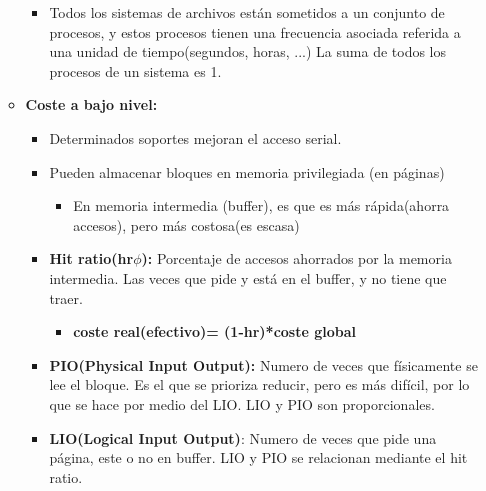 \documentclass[12pt, twoside, openright]{report} %
\begin{document}
\begin{itemize}
\begin{itemize}
        \begin{itemize}
        \item Todos los sistemas de archivos están sometidos a un conjunto
          de procesos, y estos procesos tienen una frecuencia asociada
          referida a una unidad de tiempo(segundos, horas, ...) La suma
          de todos los procesos de un sistema es 1.
          
        \end{itemize}
      \item \textbf{Coste a bajo nivel:}
        

        \begin{itemize}
        \item Determinados soportes mejoran el acceso serial.
          
        \item Pueden almacenar bloques en memoria privilegiada (en páginas)
          

          \begin{itemize}
          \item
            
            En memoria intermedia (buffer), es que es más rápida(ahorra
            accesos), pero más costosa(es escasa)
            
          \end{itemize}
        \item \textbf{Hit ratio(hr\textbar $\phi$):} Porcentaje de accesos
          ahorrados por la memoria intermedia. Las veces que pide y está
          en el buffer, y no tiene que traer.
          

          \begin{itemize}
          \item
            
            \textbf{coste real(efectivo)= (1-hr)*coste global}
            
          \end{itemize}
        \item \textbf{PIO(Physical Input Output):} Numero de veces que
          físicamente se lee el bloque. Es el que se prioriza reducir,
          pero es más difícil, por lo que se hace por medio del LIO. LIO
          y PIO son proporcionales.
          
        \item \textbf{LIO(Logical Input Output)}: Numero de veces que pide
          una página, este o no en buffer. LIO y PIO se relacionan
          mediante el hit ratio.
          

\end{itemize}
\end{itemize}
\end{itemize}
\end{document}
